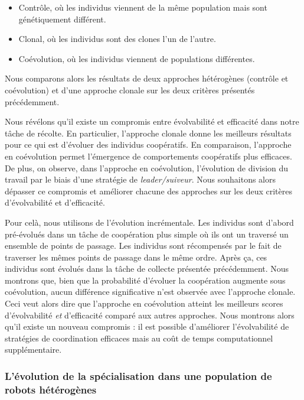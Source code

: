 			\begin{itemize}
			  \item{Contrôle, où les individus viennent de la même population mais sont génétiquement différent.}
			  \item{Clonal, où les individus sont des clones l'un de l'autre.}
			  \item{Coévolution, où les individus viennent de populations différentes.}
			\end{itemize}

			Nous comparons alors les résultats de deux approches hétérogènes (contrôle et coévolution) et d'une approche clonale sur les deux critères présentés précédemment.

			Nous révélons qu'il existe un compromis entre évolvabilité et efficacité dans notre tâche de récolte. En particulier, l'approche clonale donne les meilleurs résultats pour ce qui est d'évoluer des individus coopératifs. En comparaison, l'approche en coévolution permet l'émergence de comportements coopératifs plus efficaces. De plus, on observe, dans l'approche en coévolution, l'évolution de division du travail par le biais d'une stratégie de \emph{leader/suiveur}. Nous souhaitons alors dépasser ce compromis et améliorer chacune des approches sur les deux critères d'évolvabilité et d'efficacité.

			Pour celà, nous utilisons de l'évolution incrémentale. Les individus sont d'abord pré-évolués dans un tâche de coopération plus simple où ils ont un traversé un ensemble de points de passage. Les individus sont récompensés par le fait de traverser les mêmes points de passage dans le même ordre. Après ça, ces individus sont évolués dans la tâche de collecte présentée précédemment. Nous montrons que, bien que la probabilité d'évoluer la coopération augmente sous coévolution, aucun différence significative n'est observée avec l'approche clonale. Ceci veut alors dire que l'approche en coévolution atteint les meilleurs scores d'évolvabilité \emph{et} d'efficacité comparé aux autres approches. Nous montrons alors qu'il existe un nouveau compromis : il est possible d'améliorer l'évolvabilité de stratégies de coordination efficaces mais au coût de temps computationnel supplémentaire.


		\subsubsection{L'évolution de la spécialisation dans une population de robots hétérogènes}

